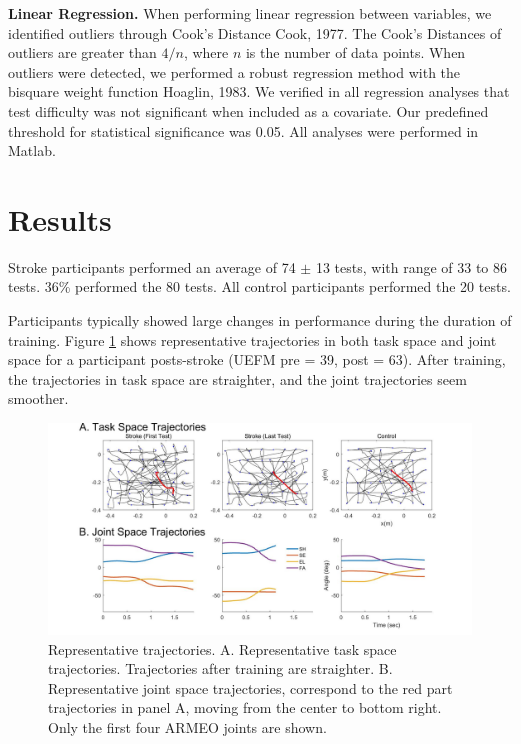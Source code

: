 \textbf{Linear Regression.}
When performing linear regression between variables, we identified outliers through Cook’s Distance {Cook, 1977}. 
The Cook’s Distances of outliers are greater than $ 4/n $, where $ n $ is the number of data points. 
When outliers were detected, we performed a robust regression method with the bisquare weight function {Hoaglin, 1983}. 
We verified in all regression analyses that test difficulty was not significant when included as a covariate. 
Our predefined threshold for statistical significance was 0.05. 
All analyses were performed in Matlab.

\section{Results}

Stroke participants performed an average of 74 $\pm$ 13 tests, with range of 33 to 86 tests. 
36\% performed the 80 tests. 
All control participants performed the 20 tests.

Participants typically showed large changes in performance during the duration of training. 
Figure \ref{fig:2stroketrajexamp} shows representative trajectories in both task space and joint space for a participant posts-stroke (UEFM pre = 39, post = 63). 
After training, the trajectories in task space are straighter, and the joint trajectories seem smoother.

\begin{figure}
	\centering
	\includegraphics[width=1\linewidth]{figures/2strokeTrajExamp}
	\caption[Representative trajectories]
	{Representative trajectories. 
		A. Representative task space trajectories. Trajectories after training are straighter.
		B. Representative joint space trajectories, correspond to the red part trajectories in panel A, moving from the center to bottom right. Only the first four ARMEO joints are shown.}
	\label{fig:2stroketrajexamp}
\end{figure}

